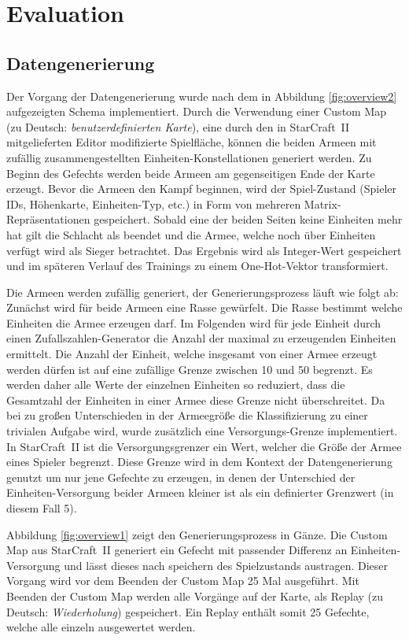 \section{Evaluation}

\subsection{Datengenerierung}
\label{datagen}

Der Vorgang der Datengenerierung wurde nach dem in Abbildung \ref{fig:overview2} aufgezeigten Schema implementiert. Durch die Verwendung einer Custom Map (zu Deutsch: \textit{benutzerdefinierten Karte}), eine durch den in StarCraft~II mitgelieferten Editor modifizierte Spielfläche, können die beiden Armeen mit zufällig zusammengestellten Einheiten-Konstellationen generiert werden. Zu Beginn des Gefechts werden beide Armeen am gegenseitigen Ende der Karte erzeugt. Bevor die Armeen den Kampf beginnen, wird der Spiel-Zustand (Spieler IDs, Höhenkarte, Einheiten-Typ, etc.) in Form von mehreren Matrix-Repräsentationen gespeichert. Sobald eine der beiden Seiten keine Einheiten mehr hat gilt die Schlacht als beendet und die Armee, welche noch über Einheiten verfügt wird als Sieger betrachtet. Das Ergebnis wird als Integer-Wert gespeichert und im späteren Verlauf des Trainings zu einem One-Hot-Vektor transformiert. 

Die Armeen werden zufällig generiert, der Generierungsprozess läuft wie folgt ab: Zunächst wird für beide Armeen eine Rasse gewürfelt. Die Rasse bestimmt welche Einheiten die Armee erzeugen darf. Im Folgenden wird für jede Einheit durch einen Zufallszahlen-Generator die Anzahl der maximal zu erzeugenden Einheiten ermittelt. Die Anzahl der Einheit, welche insgesamt von einer Armee erzeugt werden dürfen ist auf eine zufällige Grenze zwischen 10 und 50 begrenzt. Es werden daher alle Werte der einzelnen Einheiten so reduziert, dass die Gesamtzahl der Einheiten in einer Armee diese Grenze nicht überschreitet. Da bei zu großen Unterschieden in der Armeegröße die Klassifizierung zu einer trivialen Aufgabe wird, wurde zusätzlich eine Versorgungs-Grenze implementiert. In StarCraft~II ist die Versorgungsgrenzer ein Wert, welcher die Größe der Armee eines Spieler begrenzt. Diese Grenze wird in dem Kontext der Datengenerierung genutzt um nur jene Gefechte zu erzeugen, in denen der Unterschied der Einheiten-Versorgung beider Armeen kleiner ist als ein definierter Grenzwert (in diesem Fall 5).

Abbildung \ref{fig:overview1} zeigt den Generierungsprozess in Gänze. Die Custom Map aus StarCraft~II generiert ein Gefecht mit passender Differenz an Einheiten-Versorgung und lässt dieses nach speichern des Spielzustands austragen. Dieser Vorgang wird vor dem Beenden der Custom Map 25 Mal ausgeführt. Mit Beenden der Custom Map werden alle Vorgänge auf der Karte, als Replay (zu Deutsch: \textit{Wiederholung}) gespeichert. Ein Replay enthält somit 25 Gefechte, welche alle einzeln ausgewertet werden. 


